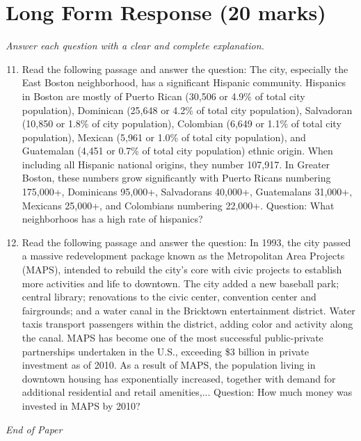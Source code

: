 \documentclass[12pt]{article}
\begin{document}
\section*{Long Form Response (20 marks)}
\textit{Answer each question with a clear and complete explanation.}
\begin{enumerate}[label=\arabic*.]
\setcounter{enumi}{10}
\item Read the following passage and answer the question: The city, especially the East Boston neighborhood, has a significant Hispanic community. Hispanics in Boston are mostly of Puerto Rican (30,506 or 4.9\% of total city population), Dominican (25,648 or 4.2\% of total city population), Salvadoran (10,850 or 1.8\% of city population), Colombian (6,649 or 1.1\% of total city population), Mexican (5,961 or 1.0\% of total city population), and Guatemalan (4,451 or 0.7\% of total city population) ethnic origin. When including all Hispanic national origins, they number 107,917. In Greater Boston, these numbers grow significantly with Puerto Ricans numbering 175,000+, Dominicans 95,000+, Salvadorans 40,000+, Guatemalans 31,000+, Mexicans 25,000+, and Colombians numbering 22,000+. Question: What neighborhoos has a high rate of hispanics?
\item Read the following passage and answer the question: In 1993, the city passed a massive redevelopment package known as the Metropolitan Area Projects (MAPS), intended to rebuild the city's core with civic projects to establish more activities and life to downtown. The city added a new baseball park; central library; renovations to the civic center, convention center and fairgrounds; and a water canal in the Bricktown entertainment district. Water taxis transport passengers within the district, adding color and activity along the canal. MAPS has become one of the most successful public-private partnerships undertaken in the U.S., exceeding \$3 billion in private investment as of 2010. As a result of MAPS, the population living in downtown housing has exponentially increased, together with demand for additional residential and retail amenities,... Question: How much money was invested in MAPS by 2010?
\end{enumerate}

\vfill
\noindent\textit{End of Paper}
\end{document}
